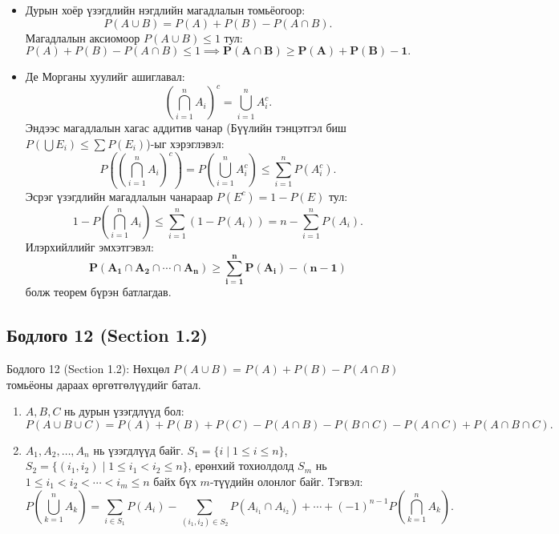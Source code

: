 \documentclass[11pt,a4paper]{article}
\begin{document}
\begin{itemize}[leftmargin=1.4em, itemsep=3pt]
  \item[\textbf{(a)}] Дурын хоёр үзэгдлийн нэгдлийн магадлалын томьёогоор:
  \[
    P(A \cup B) = P(A) + P(B) - P(A \cap B).
  \]
  Магадлалын аксиомоор $P(A \cup B) \le 1$ тул:
  \[
    P(A) + P(B) - P(A \cap B) \le 1 \implies \mathbf{P(A \cap B) \ge P(A) + P(B) - 1}.
  \]

  \item[\textbf{(б)}] Де Морганы хуулийг ашиглавал:
  \[
    \left(\bigcap_{i=1}^n A_i\right)^c = \bigcup_{i=1}^n A_i^c.
  \]
  Эндээс магадлалын хагас аддитив чанар (Бүүлийн тэнцэтгэл биш $P(\bigcup E_i) \le \sum P(E_i)$)-ыг хэрэглэвэл:
  \[
    P\left(\left(\bigcap_{i=1}^n A_i\right)^c\right) = P\left(\bigcup_{i=1}^n A_i^c\right) \le \sum_{i=1}^n P(A_i^c).
  \]
  Эсрэг үзэгдлийн магадлалын чанараар $P(E^c) = 1 - P(E)$ тул:
  \[
    1 - P\left(\bigcap_{i=1}^n A_i\right) \le \sum_{i=1}^n (1 - P(A_i)) = n - \sum_{i=1}^n P(A_i).
  \]
  Илэрхийллийг эмхэтгэвэл:
  \[
    \mathbf{P(A_1 \cap A_2 \cap \cdots \cap A_n) \ge \sum_{i=1}^n P(A_i) - (n - 1)}
  \]
  болж теорем бүрэн батлагдав.
\end{itemize}

\vspace{0.8em}

\subsection*{Бодлого 12 (Section 1.2)}

\begin{problembox}{Бодлого 12 (Section 1.2): Нөхцөл}
$P(A \cup B) = P(A) + P(B) - P(A \cap B)$ томьёоны дараах өргөтгөлүүдийг батал.
\begin{enumerate}[label=\textbf{(\alph*)}, leftmargin=1.8em, itemsep=1pt]
  \item $A, B, C$ нь дурын үзэгдлүүд бол:
  \[
    P(A \cup B \cup C) = P(A) + P(B) + P(C) - P(A \cap B) - P(B \cap C) - P(A \cap C) + P(A \cap B \cap C).
  \]
  \item $A_1, A_2, \ldots, A_n$ нь үзэгдлүүд байг. $S_1 = \{i \mid 1 \le i \le n\}$, $S_2 = \{(i_1, i_2) \mid 1 \le i_1 < i_2 \le n\}$, ерөнхий тохиолдолд $S_m$ нь $1 \le i_1 < i_2 < \cdots < i_m \le n$ байх бүх $m$-түүдийн олонлог байг. Тэгвэл:
  \[
    P\left(\bigcup_{k=1}^n A_k\right) = \sum_{i \in S_1} P(A_i) - \sum_{(i_1, i_2) \in S_2} P(A_{i_1} \cap A_{i_2}) + \cdots + (-1)^{n-1} P\left(\bigcap_{k=1}^n A_k\right).
  \]
\end{enumerate}
\end{problembox}
\end{document}
